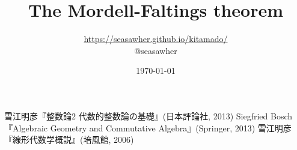 \documentclass[10pt]{jsarticle}
\begin{document}
\title{The Mordell-Faltings theorem}
\author{\url{https://seasawher.github.io/kitamado/} \\ @seasawher}
\date{\today}
\maketitle



\newpage



\begin{thebibliography}{1}
 雪江明彦『整数論2 代数的整数論の基礎』(日本評論社, 2013)
 Siegfried Bosch『Algebraic Geometry and Commutative Algebra』(Springer, 2013)
 雪江明彦『線形代数学概説』(培風館, 2006)
\end{thebibliography}
\end{document}
